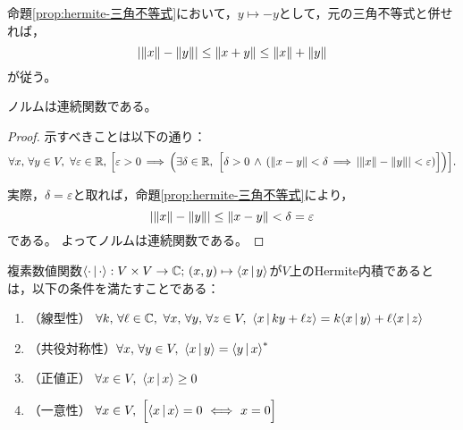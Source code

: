\documentclass[a4paper,draft]{ltjsarticle}
\begin{document}
\begin{cor}
    命題\ref{prop:hermite-三角不等式}において，$y\mapsto -y$として，元の三角不等式と併せれば，
    \begin{equation}
        \abs{\norm{x}-\norm{y}}\leq \norm{x+y}\leq \norm{x}+\norm{y}
    \end{equation}
    が従う。
\end{cor}

\begin{cor}[ノルムの連続性]
    ノルムは連続関数である。
    \begin{proof}
        示すべきことは以下の通り：
        \begin{equation}
            \forall x,\,\forall y\in V,\ \forall \varepsilon\in\R,\, \squ{
                \varepsilon>0 \, \Longrightarrow\, \pare{
                    \exists \delta\in \R,\ \bsqu{
                        \delta>0\, \land\, \pare{
                            \norm{x-y}<\delta\, \Longrightarrow\, \abs{\norm{x}-\norm{y}}<\varepsilon
                        }
                    }
                }
            }.
        \end{equation}

        実際，$\delta=\varepsilon$と取れば，命題\ref{prop:hermite-三角不等式}により，
        \begin{equation}
            \abs{\norm{x}-\norm{y}}\leq \norm{x-y}<\delta =\varepsilon
        \end{equation}
        である。
        よってノルムは連続関数である。
    \end{proof}
\end{cor}


\begin{defi}[Hermite内積]
    複素数値関数$\inner{\cdot}{\cdot}:V\times V\to \CC;\, \pare{x,y}\mapsto \inner{x}{y}$が$V$上のHermite内積であるとは，以下の条件を満たすことである：
    \begin{enumerate}[label=(\roman*)]
        \item （線型性） $\forall k,\,\forall \ell\in\CC,\ \forall x,\,\forall y,\, \forall z\in V,\ \inner{x}{ky+\ell z}=k\inner{x}{y}+\ell\inner{x}{z}$
        \item （共役対称性）$\forall x,\,\forall y\in V,\ \inner{x}{y}=\inner{y}{x}^*$
        \item （正値正） $\forall x\in V,\ \inner{x}{x}\geq 0$
        \item （一意性） $\forall x\in V,\ \bsqu{\inner{x}{x}=0 \ \Longleftrightarrow\ x=0}$
    \end{enumerate}
\end{defi}
\end{document}
